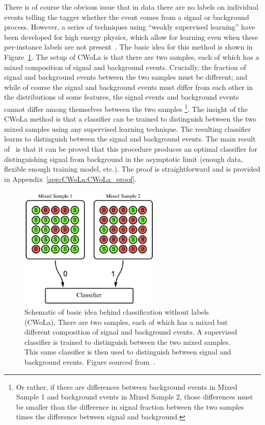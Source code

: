 There is of course the obvious issue that in data there are no labels on individual events telling the tagger whether the event comes from a signal or background process.
However, a series of techniques using ``weakly supervised learning'' have been developed for high energy physics, which allow for learning even when these per-instance labels are not present~\cite{Metodiev:2017vrx,Dery:2017fap,Cohen:2017exh,Komiske:2018oaa}.
The basic idea for this method is shown in Figure~\ref{fig:CWoLa:cwolasetup}.
The setup of CWoLa is that there are two samples, each of which has a mixed composition of signal and background events.
Crucially, the fraction of signal and background events between the two samples must be different; and while of course the signal and background events must differ from each other in the distributions of some features, the signal events and background events cannot differ among themselves between the two samples
\footnote{
Or rather, if there are differences between background events in Mixed Sample 1 and background events in Mixed Sample 2, those differences must be smaller than the difference in signal fraction between the two samples times the difference between signal and background.  
}.
The insight of the CWoLa method is that a classifier can be trained to distinguish between the two mixed samples using any supervised learning technique.
The resulting classifier learns to distinguish between the signal and background events.
The main result of~\cite{Metodiev:2017vrx} is that it can be proved that this procedure produces an optimal classifier for distinguishing signal from background in the asymptotic limit (enough data, flexible enough training model, etc.).
The proof is straightforward and is provided in Appendix~\ref{app:CWoLa:CWoLa_proof}.

\begin{figure}
\centering
\includegraphics[width=0.6\textwidth]{figures_CWoLa/cwola_nokoala.png}
\caption{
  Schematic of basic idea behind classification without labels (CWoLa).
  There are two samples, each of which has a mixed but different composition of signal and background events.
  A supervised classifier is trained to distinguish between the two mixed samples.
  This same classifier is then used to distinguish between signal and background events.
  Figure sourced from~\cite{Metodiev:2017vrx}.
}
\label{fig:CWoLa:cwolasetup}
\end{figure}

